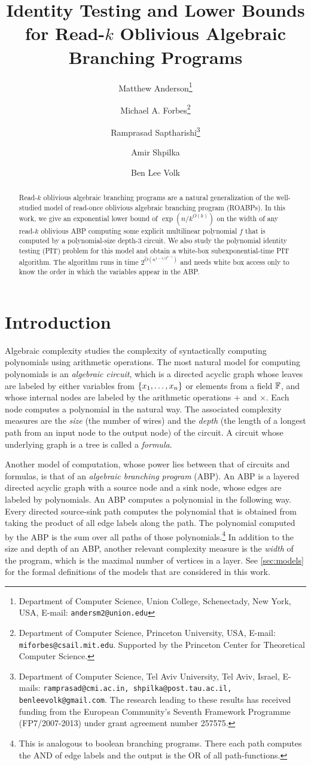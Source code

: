 \documentclass[11pt]{article}
\date{}
\title{Identity Testing and Lower Bounds for Read-$k$ Oblivious Algebraic Branching Programs%
{\IfFileExists{./sha.tex}{\\\small SHA: }{}}}
\author{
Matthew Anderson\thanks{Department of Computer Science, Union College, Schenectady, New York, USA, E-mail: \texttt{andersm2@union.edu}}%
\and%
Michael A. Forbes\thanks{Department of Computer Science, Princeton University, USA, E-mail: \texttt{miforbes@csail.mit.edu}. Supported by the Princeton Center for Theoretical Computer Science.}%
\and%
Ramprasad Saptharishi\thanks{Department of Computer Science, Tel Aviv University, Tel Aviv, Israel, E-mails: \texttt{ramprasad@cmi.ac.in, shpilka@post.tau.ac.il, benleevolk@gmail.com}. The research leading to these results has received funding from the European Community's Seventh Framework Programme (FP7/2007-2013) under grant agreement number 257575.}%
\and%
Amir Shpilka\samethanks[3]
\and%
Ben Lee Volk\samethanks[3]
}
\begin{document}
\maketitle

\begin{abstract}
  Read-$k$ oblivious algebraic branching programs are a natural generalization of the well-studied model of read-once oblivious algebraic branching program (ROABPs).
In this work, we give an exponential lower bound of $\exp(n/k^{O(k)})$ on the width of any read-$k$ oblivious ABP computing some explicit multilinear polynomial $f$ that is computed by a polynomial-size depth-$3$ circuit.
We also study the polynomial identity testing (PIT) problem for this model and obtain a white-box subexponential-time PIT algorithm.
The algorithm runs in time $2^{\tilde{O}(n^{1-1/2^{k-1}})}$ and needs white box access only to know the order in which the variables appear in the ABP.

\end{abstract}

\thispagestyle{empty}
\newpage
{}


\section{Introduction}
\label{sec:intro}

Algebraic complexity studies the complexity of syntactically computing polynomials using arithmetic operations.
The most natural model for computing polynomials is an {\em algebraic circuit}, which is a directed acyclic graph whose leaves are labeled by either variables from $\left\{ x_1, \ldots, x_n \right\}$ or elements from a field $\F$, and whose internal nodes are labeled by the arithmetic operations $+$ and $\times$.
Each node computes a polynomial in the natural way.
The associated complexity measures are the {\em size} (the number of wires) and the {\em depth} (the length of a longest path from an input node to the output node) of the circuit.
A circuit whose underlying graph is a tree is called a {\em formula}.

Another model of computation, whose power lies between that of circuits and formulas, is that of an {\em algebraic branching program} (ABP).
An ABP is a layered directed acyclic graph with a source node and a sink node, whose edges are labeled by polynomials.
An ABP computes a polynomial in the following way.
Every directed source-sink path computes the polynomial that is obtained from taking the product of all edge labels along the path.
The polynomial computed by the ABP is the sum over all paths of those polynomials.\footnote{This is analogous to boolean branching programs.
There each path computes the AND of edge labels and the output is the OR of all path-functions.}
In addition to the size and depth of an ABP, another relevant complexity measure is the {\em width} of the program, which is the maximal number of vertices in a layer.  See \autoref{sec:models} for the formal definitions of the models that are considered in this work.
\end{document}
